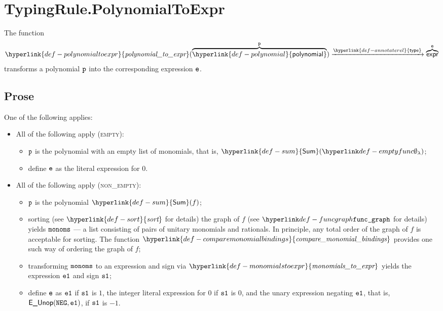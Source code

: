 \documentclass{book}
\newcommand\annotaterel[0]{\hyperlink{def-annotaterel}{\textsf{type}}}
\newcommand\typearrow[0]{\xrightarrow{\annotaterel}}
\newcommand\sort[0]{\hyperlink{def-sort}{\textfunc{sort}}}
\newcommand\comparemonomialbindings[0]{\hyperlink{def-comparemonomialbindings}{\textfunc{compare\_monomial\_bindings}}}
\newcommand\polynomialtoexpr[0]{\hyperlink{def-polynomialtoexpr}{\textfunc{polynomial\_to\_expr}}}
\newcommand\monomialstoexpr[0]{\hyperlink{def-monomialstoexpr}{\textfunc{monomials\_to\_expr}}}
\newcommand\Sum[0]{\hyperlink{def-sum}{\textsf{Sum}}}
\newcommand\polynomial[0]{\hyperlink{def-polynomial}{\textsf{polynomial}}}
\begin{document}
\section{TypingRule.PolynomialToExpr \label{sec:TypingRule.PolynomialToExpr}}
\hypertarget{def-polynomialtoexpr}{}
The function
\[
\polynomialtoexpr(\overname{\polynomial}{\vp}) \typearrow \overname{\expr}{\ve}
\]
transforms a polynomial $\texttt{p}$ into the corresponding expression $\texttt{e}$.

\subsection{Prose}
One of the following applies:
\begin{itemize}
  \item All of the following apply (\textsc{empty}):
  \begin{itemize}
    \item $\texttt{p}$ is the polynomial with an empty list of monomials, that is, $\Sum(\emptyfunc)$;
    \item define $\texttt{e}$ as the literal expression for $0$.
  \end{itemize}

  \item All of the following apply (\textsc{non\_empty}):
  \begin{itemize}
    \item $\texttt{p}$ is the polynomial $\Sum(f)$;
    \item sorting (see $\sort$ for details) the graph of $f$ (see $\funcgraph$ for details)
          yields $\texttt{monoms}$ --- a list consisting of pairs of unitary monomials and rationals.
          In principle, any total order of the graph of $f$ is acceptable for sorting.
          The function $\comparemonomialbindings$ provides one such way of ordering
          the graph of $f$;
    \item transforming $\texttt{monoms}$ to an expression and sign via $\monomialstoexpr$ yields the expression $\texttt{e1}$
          and sign $\texttt{s1}$;
    \item define $\texttt{e}$ as $\texttt{e1}$ if $\texttt{s1}$ is $1$, the integer literal expression for $0$ if $\texttt{s1}$ is $0$,
          and the unary expression negating $\texttt{e1}$, that is,
          $\textsf{E\_Unop}(\texttt{NEG}, \texttt{e1})$, if $\texttt{s1}$ is $-1$.
  \end{itemize}
\end{itemize}
\end{document}
